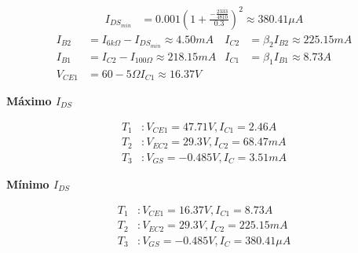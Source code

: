 \begin{align*}
  I_{DS_{min}} &= 0.001 \left( 1 + \frac{- \frac{2333}{4810}}{0.3} \right)^2 \approx 380.41\mu A
\end{align*}
\begin{align*}
  I_{B2} &= I_{6k\Omega} - I_{DS_{min}} \approx 4.50mA
  &
  I_{C2} &= \beta_2 I_{B2} \approx 225.15mA
  \\
  I_{B1} &= I_{C2} - I_{100\Omega} \approx 218.15mA
  &
  I_{C1} &= \beta_1 I_{B1} \approx 8.73A
  \\
  V_{CE1} &= 60 - 5\Omega I_{C1} \approx 16.37V
\end{align*}


\textbf{Máximo $I_{DS}$}

\begin{align*}
  T_1 &: V_{CE1} = 47.71V, I_{C1} = 2.46A
  \\
  T_2 &: V_{EC2} = 29.3V, I_{C2} = 68.47mA
  \\
  T_3 &: V_{GS} = -0.485V, I_C = 3.51mA
\end{align*}

\textbf{Mínimo $I_{DS}$}

\begin{align*}
  T_1 &: V_{CE1} = 16.37V, I_{C1} = 8.73A
  \\
  T_2 &: V_{EC2} = 29.3V, I_{C2} = 225.15mA
  \\
  T_3 &: V_{GS} = -0.485V, I_C = 380.41 \mu A
\end{align*}
